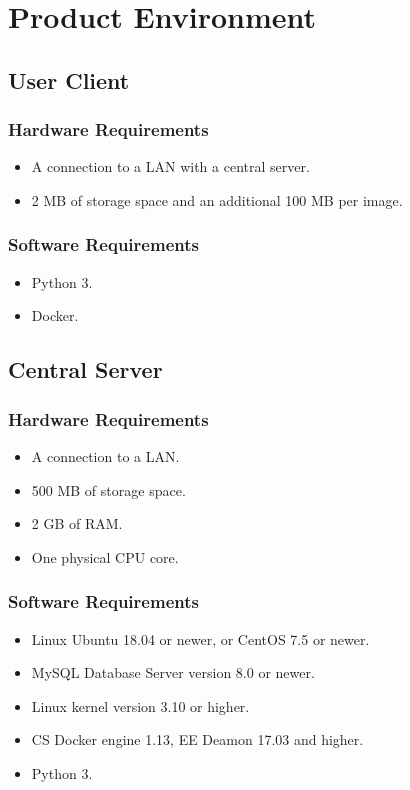 \section{Product Environment}
  \subsection{User Client}
    \subsubsection{Hardware Requirements}
      \begin{itemize}
      \item A connection to a LAN with a central server.
      \item 2 MB of storage space and an additional 100 MB per image.
      \end{itemize}
    \subsubsection{Software Requirements}
      \begin{itemize}
      \item Python 3.
      \item Docker.
    \end{itemize}

  \subsection{Central Server}
    \subsubsection{Hardware Requirements}  
    \begin{itemize}
      \item A connection to a LAN.
      \item 500 MB of storage space.
      \item 2 GB of RAM.
      \item One physical CPU core.
    \end{itemize}
    \subsubsection{Software Requirements}  
    \begin{itemize}
      \item Linux Ubuntu 18.04 or newer, or CentOS 7.5 or newer.
      \item MySQL Database Server version 8.0 or newer.
      \item Linux kernel version 3.10 or higher.
      \item CS Docker engine 1.13, EE Deamon 17.03 and higher.
      \item Python 3.
    \end{itemize}

